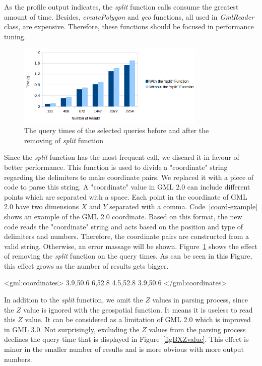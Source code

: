 \documentclass[a4paper,12pt]{article}
\begin{document}
As the profile output indicates, the \textit{split} function calls consume the greatest amount of time. Besides, \textit{createPolygon} and \textit{geo} functions, all used in \textit{GmlReader} class, are expensive. Therefore, these functions should be focused in performance tuning. 
\begin{figure}
\centering
\includegraphics[width=0.8\textwidth,height=0.2\textheight]{BXSplit}
\caption{The query times of the selected queries before and after the removing of \textit{split} function}
\label{figBXSplit}
\end{figure}
Since the \textit{split} function has the most frequent call, we discard it in favour of better performance. This function is used to divide a "coordinate" string regarding the delimiters to make coordinate pairs. We replaced it with a piece of code to parse this string. 
A "coordinate" value in GML 2.0 can include different points which are separated with a space. Each point in the coordinate of GML 2.0 have two dimensions $X$ and $Y$ separated with a comma. Code~\ref{coord-example} shows an example of the GML 2.0 coordinate. Based on this format, the new code reads the "coordinate" string and acts based on the position and type of delimiters and numbers. Therefore, the coordinate pairs are constructed from a valid string. Otherwise, an error massage will be shown. Figure~\ref{figBXSplit} shows the effect of removing the \textit{split} function on the query times. As can be seen in this Figure, this effect grows as the number of results gets bigger.
 
\vspace{10px}
\begin{fakeXML}[label=coord-example,caption=An example of GML 2.0 coordinate]
<gml:coordinates>
  3.9,50.6 6,52.8 4.5,52.8 3.9,50.6
</gml:coordinates>
\end{fakeXML}
\vspace{10px}

In addition to the \textit{split} function, we omit the $Z$ values in parsing process, since the $Z$ value is ignored with the geospatial function. It means it is useless to read this $Z$ value. It can be considered as a limitation of GML 2.0 which is improved in GML 3.0. Not surprisingly, excluding the $Z$ values from the parsing process declines the query time that is displayed in Figure~\ref{figBXZvalue}. This effect is minor in the smaller number of results and is more obvious with more output numbers.
\end{document}
